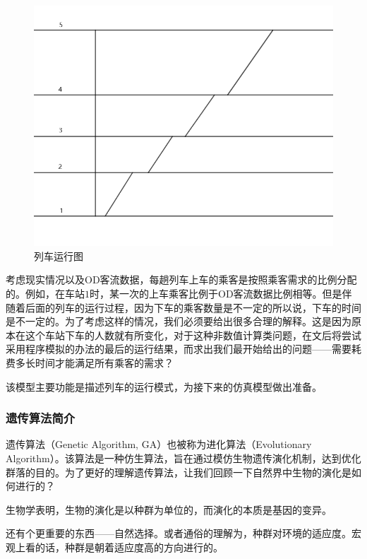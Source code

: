 \begin{figure}[h]
    \centering
    \includegraphics[scale=0.3]{res/figure160314.png}
    \caption{列车运行图}
\end{figure}

考虑现实情况以及OD客流数据，每趟列车上车的乘客是按照乘客需求的比例分配的。例如，在车站$1$时，某一次的上车乘客比例于OD客流数据比例相等。但是伴随着后面的列车的运行过程，因为下车的乘客数量是不一定的所以说，下车的时间是不一定的。为了考虑这样的情况，我们必须要给出很多合理的解释。这是因为原本在这个车站下车的人数就有所变化，对于这种非数值计算类问题，在文后将尝试采用程序模拟的办法的最后的运行结果，而求出我们最开始给出的问题——需要耗费多长时间才能满足所有乘客的需求？

该模型主要功能是描述列车的运行模式，为接下来的仿真模型做出准备。

\subsubsection{遗传算法简介}

遗传算法（Genetic Algorithm, GA）也被称为进化算法（Evolutionary Algorithm）。该算法是一种仿生算法，旨在通过模仿生物遗传演化机制，达到优化群落的目的\cite{hanJiyuyichuanheshengsuanfaqiujiehanshuyouhuawenti2010}。为了更好的理解遗传算法，让我们回顾一下自然界中生物的演化是如何进行的？

生物学表明，生物的演化是以种群为单位的，而演化的本质是基因的变异。

还有个更重要的东西——自然选择。或者通俗的理解为，种群对环境的适应度。宏观上看的话，种群是朝着适应度高的方向进行的。

